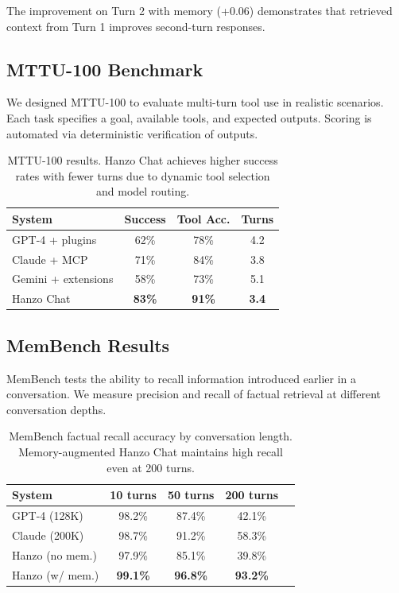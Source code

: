 \documentclass[11pt,twocolumn]{article}
\begin{document}
The improvement on Turn 2 with memory (+0.06) demonstrates that retrieved context from Turn 1 improves second-turn responses.

\subsection{MTTU-100 Benchmark}

We designed MTTU-100 to evaluate multi-turn tool use in realistic scenarios. Each task specifies a goal, available tools, and expected outputs. Scoring is automated via deterministic verification of outputs.

\begin{table}[H]
\centering
\small
\begin{tabular}{lccc}
\toprule
\textbf{System} & \textbf{Success} & \textbf{Tool Acc.} & \textbf{Turns} \\
\midrule
GPT-4 + plugins & 62\% & 78\% & 4.2 \\
Claude + MCP & 71\% & 84\% & 3.8 \\
Gemini + extensions & 58\% & 73\% & 5.1 \\
Hanzo Chat & \textbf{83\%} & \textbf{91\%} & \textbf{3.4} \\
\bottomrule
\end{tabular}
\caption{MTTU-100 results. Hanzo Chat achieves higher success rates with fewer turns due to dynamic tool selection and model routing.}
\label{tab:mttu}
\end{table}

\subsection{MemBench Results}

MemBench tests the ability to recall information introduced earlier in a conversation. We measure precision and recall of factual retrieval at different conversation depths.

\begin{table}[H]
\centering
\small
\begin{tabular}{lcccc}
\toprule
\textbf{System} & \textbf{10 turns} & \textbf{50 turns} & \textbf{200 turns} \\
\midrule
GPT-4 (128K) & 98.2\% & 87.4\% & 42.1\% \\
Claude (200K) & 98.7\% & 91.2\% & 58.3\% \\
Hanzo (no mem.) & 97.9\% & 85.1\% & 39.8\% \\
Hanzo (w/ mem.) & \textbf{99.1\%} & \textbf{96.8\%} & \textbf{93.2\%} \\
\bottomrule
\end{tabular}
\caption{MemBench factual recall accuracy by conversation length. Memory-augmented Hanzo Chat maintains high recall even at 200 turns.}
\label{tab:membench}
\end{table}
\end{document}
